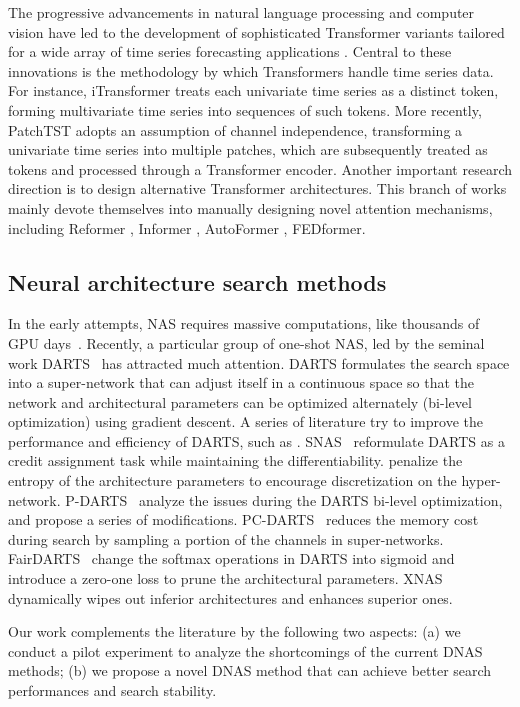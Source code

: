 The progressive advancements in natural language processing and computer vision have led to the development of sophisticated Transformer \cite{Vaswani2017AttentionIA} variants tailored for a wide array of time series forecasting applications \cite{zhou2021informer,wu2021autoformer}. Central to these innovations is the methodology by which Transformers handle time series data. For instance, iTransformer \cite{liu2023itransformer} treats each univariate time series as a distinct token, forming multivariate time series into sequences of such tokens. More recently, PatchTST \cite{nie2022time} adopts an assumption of channel independence, transforming a univariate time series into multiple patches, which are subsequently treated as tokens and processed through a Transformer encoder. Another important research direction is to design alternative Transformer architectures. This branch of works mainly devote themselves into manually designing novel attention mechanisms, including  Reformer \cite{kitaev2020reformer}, Informer \cite{zhou2021informer}, AutoFormer \cite{wu2021autoformer}, FEDformer\cite{zhou2022fedformer}. 


\subsection{Neural architecture search methods}

In the early attempts, NAS requires massive computations, like thousands of GPU days~\cite{Zoph2017NeuralAS,Zoph2018LearningTA,Liu2018ProgressiveNA}. Recently, a particular group of one-shot NAS, led by the seminal work DARTS~\cite{Liu2019DARTSDA} has attracted much attention. DARTS formulates the search space into a super-network that can adjust itself in a continuous space so that the network and architectural parameters can be optimized alternately (bi-level optimization) using gradient descent. A series of literature try to improve the performance and efficiency of DARTS, such as \cite{Xie2019SNASSN,Chen2021ProgressiveDB,Chu2021FairNASRE,Nayman2019XNASNA}. SNAS~\cite{Xie2019SNASSN} reformulate DARTS as a credit assignment task while maintaining the differentiability. \cite{Gao2020MTLNASTN} penalize the entropy of the architecture parameters to encourage discretization on the hyper-network. P-DARTS~\cite{Chen2021ProgressiveDB} analyze the issues during the DARTS bi-level optimization, and propose a series of modifications. PC-DARTS~\cite{Xu2021PartiallyConnectedNA} reduces the memory cost during search by sampling a portion of the channels in super-networks. FairDARTS~\cite{Chu2021FairNASRE} change the softmax operations in DARTS into sigmoid and introduce a zero-one loss to prune the architectural parameters. XNAS~\cite{Nayman2019XNASNA} dynamically wipes out inferior architectures and enhances superior ones.

Our work complements the literature by the following two aspects: (a) we conduct a pilot experiment to analyze the shortcomings of the current DNAS methods; (b) we propose a novel DNAS method that can achieve better search performances and search stability.